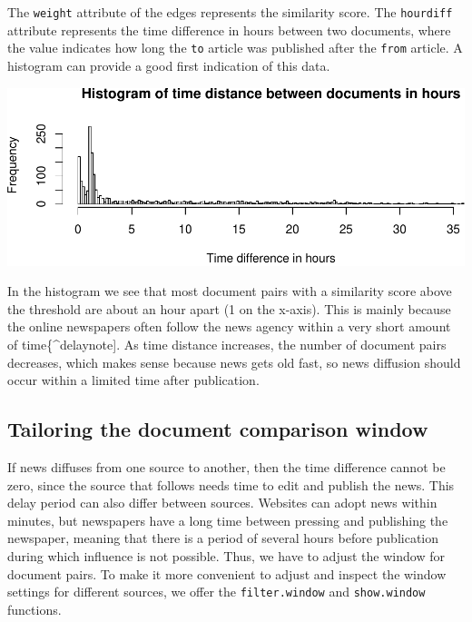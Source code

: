 \documentclass[]{article}
\newenvironment{Shaded}{\begin{snugshade}}{\end{snugshade}}
\newcommand{\KeywordTok}[1]{\textcolor[rgb]{0.13,0.29,0.53}{\textbf{{#1}}}}
\newcommand{\DataTypeTok}[1]{\textcolor[rgb]{0.13,0.29,0.53}{{#1}}}
\newcommand{\DecValTok}[1]{\textcolor[rgb]{0.00,0.00,0.81}{{#1}}}
\newcommand{\StringTok}[1]{\textcolor[rgb]{0.31,0.60,0.02}{{#1}}}
\newcommand{\NormalTok}[1]{{#1}}
\begin{document}
The \texttt{weight} attribute of the edges represents the similarity
score. The \texttt{hourdiff} attribute represents the time difference in
hours between two documents, where the value indicates how long the
\texttt{to} article was published after the \texttt{from} article. A
histogram can provide a good first indication of this data.

\begin{Shaded}
\end{Shaded}

\includegraphics{vignette_files/figure-latex/unnamed-chunk-11-1.pdf}

In the histogram we see that most document pairs with a similarity score
above the threshold are about an hour apart (1 on the x-axis). This is
mainly because the online newspapers often follow the news agency within
a very short amount of time\{\^{}delaynote{]}. As time distance
increases, the number of document pairs decreases, which makes sense
because news gets old fast, so news diffusion should occur within a
limited time after publication.

\subsection{Tailoring the document comparison
window}\label{tailoring-the-document-comparison-window}

If news diffuses from one source to another, then the time difference
cannot be zero, since the source that follows needs time to edit and
publish the news. This delay period can also differ between sources.
Websites can adopt news within minutes, but newspapers have a long time
between pressing and publishing the newspaper, meaning that there is a
period of several hours before publication during which influence is not
possible. Thus, we have to adjust the window for document pairs. To make
it more convenient to adjust and inspect the window settings for
different sources, we offer the \texttt{filter.window} and
\texttt{show.window} functions.
\end{document}

